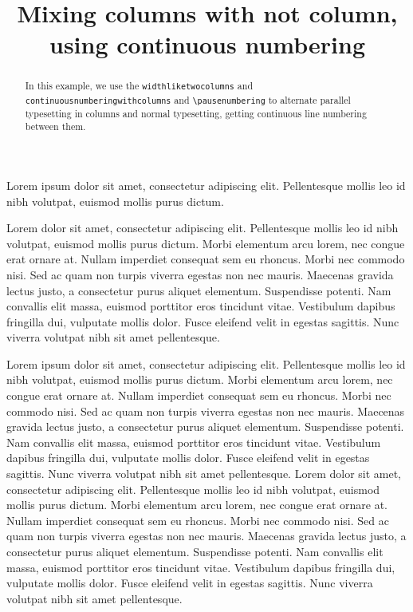 \documentclass[]{article}
\begin{document}
\begin{english}
\title{Mixing columns with not column, using continuous numbering}
\begin{abstract}
In this example, we use the \verb+widthliketwocolumns+ and \verb+continuousnumberingwithcolumns+ and \verb+\pausenumbering+ to alternate parallel typesetting in columns and normal typesetting, getting continuous line numbering between them.
\end{abstract}
\end{english}
\begin{pairs}  
\begin{Leftside} 
\beginnumbering  
\pstart  
Lorem ipsum dolor sit amet, consectetur adipiscing elit. Pellentesque mollis leo id nibh volutpat, euismod mollis purus dictum.
\pend 

\pstart  
Lorem   dolor sit amet, consectetur adipiscing elit. Pellentesque mollis leo id nibh volutpat, euismod mollis purus dictum. Morbi elementum arcu lorem, nec congue erat ornare at. Nullam imperdiet consequat sem eu rhoncus. Morbi nec commodo nisi. Sed ac quam non turpis viverra egestas non nec mauris. Maecenas gravida lectus justo, a consectetur purus aliquet elementum. Suspendisse potenti. Nam convallis elit massa, euismod porttitor eros tincidunt vitae. Vestibulum dapibus fringilla dui, vulputate mollis dolor. Fusce eleifend velit in egestas sagittis. Nunc viverra volutpat nibh sit amet pellentesque.
\pend   
\endnumbering
\end{Leftside} 

\begin{Rightside}   
\beginnumbering  
\pstart  
Lorem ipsum dolor sit amet, consectetur adipiscing elit. Pellentesque mollis leo id nibh volutpat, euismod mollis purus dictum. Morbi elementum arcu lorem, nec congue erat ornare at. Nullam imperdiet consequat sem eu rhoncus. Morbi nec commodo nisi. Sed ac quam non turpis viverra egestas non nec mauris. Maecenas gravida lectus justo, a consectetur purus aliquet elementum. Suspendisse potenti. Nam convallis elit massa, euismod porttitor eros tincidunt vitae. Vestibulum dapibus fringilla dui, vulputate mollis dolor. Fusce eleifend velit in egestas sagittis. Nunc viverra volutpat nibh sit amet pellentesque.
\pend  
\pstart  
Lorem dolor sit amet, consectetur adipiscing elit. Pellentesque mollis leo id nibh volutpat, euismod mollis purus dictum. Morbi elementum arcu lorem, nec congue erat ornare at. Nullam imperdiet consequat sem eu rhoncus. Morbi nec commodo nisi. Sed ac quam non turpis viverra egestas non nec mauris. Maecenas gravida lectus justo, a consectetur purus aliquet elementum. Suspendisse potenti. Nam convallis elit massa, euismod porttitor eros tincidunt vitae. Vestibulum dapibus fringilla dui, vulputate mollis dolor. Fusce eleifend velit in egestas sagittis. Nunc viverra volutpat nibh sit amet pellentesque.

\pend  
\endnumbering
\end{Rightside}  

\end{pairs}  
\Columns
\end{document}
